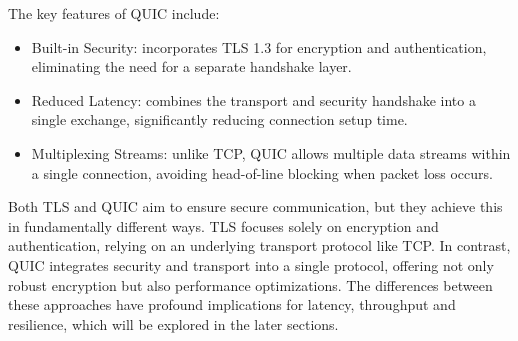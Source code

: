 The key features of QUIC include:

\begin{itemize}
\item Built-in Security: incorporates TLS 1.3 for encryption and authentication, eliminating the need for a separate handshake layer.

\item Reduced Latency: combines the transport and security handshake into a single exchange, significantly reducing connection setup time.

\item Multiplexing Streams: unlike TCP, QUIC allows multiple data streams within a single connection, avoiding head-of-line blocking when packet loss occurs.
\end{itemize}

Both TLS and QUIC aim to ensure secure communication, but they achieve this in fundamentally different ways. TLS focuses solely on encryption and authentication, relying on an underlying transport protocol like TCP. In contrast, QUIC integrates security and transport into a single protocol, offering not only robust encryption but also performance optimizations. The differences between these approaches have profound implications for latency, throughput and resilience, which will be explored in the later sections.